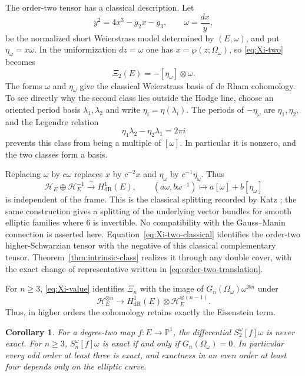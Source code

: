\documentclass[11pt]{amsart}
\newtheorem{cor}[thm]{Corollary}
\theoremstyle{definition}
\theoremstyle{remark}
\numberwithin{equation}{section}
\begin{document}
The order-two tensor has a classical description. Let
\[
y^2=4x^3-g_2x-g_3,\qquad \omega=\frac{dx}{y},
\]
be the normalized short Weierstrass model determined by $(E,\omega)$,
and put $\eta_\omega=x\omega$. In the uniformization $dz=\omega$ one
has $x=\wp(z;\Omega_\omega)$, so \eqref{eq:Xi-two} becomes
\begin{equation}\label{eq:Xi-two-classical}
\Xi_2(E)=-[\eta_\omega]\otimes\omega.
\end{equation}
The forms $\omega$ and $\eta_\omega$ give the classical Weierstrass
basis of de Rham cohomology. To see directly why the second class lies
outside the Hodge line, choose an oriented period basis
$\lambda_1,\lambda_2$ and write $\eta_i=\eta(\lambda_i)$. The periods
of $-\eta_\omega$ are $\eta_1,\eta_2$, and the Legendre relation
\begin{equation}\label{eq:Legendre}
\eta_1\lambda_2-\eta_2\lambda_1=2\pi i
\end{equation}
\cite{lang,weil} prevents this class from being a multiple of $[\omega]$.
In particular it is nonzero, and the two classes form a basis.

Replacing $\omega$ by $c\omega$ replaces $x$ by $c^{-2}x$ and
$\eta_\omega$ by $c^{-1}\eta_\omega$. Thus
\begin{equation}\label{eq:Weierstrass-splitting}
\mathcal H_E\oplus\mathcal H_E^{-1}
\xrightarrow{\ \sim\ }H^1_{\mathrm{dR}}(E),
\qquad
(a\omega,b\omega^{-1})\longmapsto a[\omega]+b[\eta_\omega]
\end{equation}
is independent of the frame. This is the classical splitting recorded
by Katz \cite[Appendix~A1.2, Eqs.~(A1.2.4)--(A1.2.6)]{katz}; the same
construction gives a splitting of the underlying vector bundles for
smooth elliptic families where $6$ is invertible. No compatibility
with the Gauss--Manin connection is asserted here.
Equation~\eqref{eq:Xi-two-classical} identifies the order-two
higher-Schwarzian tensor with the negative of this classical
complementary tensor. Theorem~\ref{thm:intrinsic-class} realizes it
through any double cover, with the exact change of representative
written in \eqref{eq:order-two-translation}.

For $n\geq3$, \eqref{eq:Xi-value} identifies $\Xi_n$ with the image of
$G_n(\Omega_\omega)\omega^{\otimes n}$ under
\[
\mathcal H_E^{\otimes n}\longrightarrow
H^1_{\mathrm{dR}}(E)\otimes\mathcal H_E^{\otimes(n-1)}.
\]
Thus, in higher orders the cohomology retains exactly the Eisenstein
term.

\begin{cor}\label{cor:exactness-criterion}
For a degree-two map $f:E\to\mathbb P^1$, the differential
$S_2^\omega[f]\omega$ is never exact. For $n\geq3$,
$S_n^\omega[f]\omega$ is exact if and only if
$G_n(\Omega_\omega)=0$. In particular every odd order at least three
is exact, and exactness in an even order at least four depends only
on the elliptic curve.
\end{cor}
\end{document}
